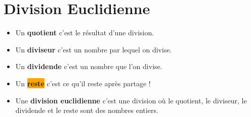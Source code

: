 
\section{Division Euclidienne}
\begin{definition}[Vocabulaire]
\begin{itemize}
\item Un \colorbox{red!30}{\textbf{quotient}} c'est le résultat d'une division.
\item Un \colorbox{green!30}{\textbf{diviseur}} c'est un nombre par lequel on divise.
\item Un \colorbox{blue!30}{\textbf{dividende}} c'est un nombre que l'on divise.
\item Un \colorbox{orange}{\textbf{reste}} c'est ce qu'il reste après partage !
\item Une \textbf{division euclidienne} c'est une division où le quotient, le diviseur, le dividende et le reste sont des nombres entiers.
\end{itemize}
\end{definition}

